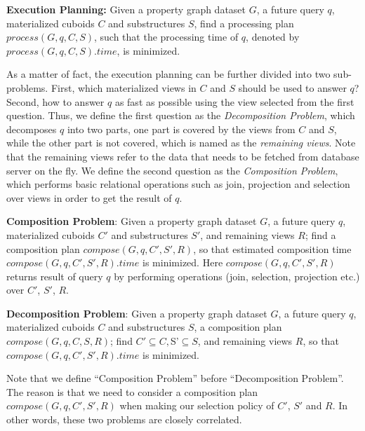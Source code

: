 \noindent\textbf{Execution Planning:} Given a property graph dataset $G$, a future query $q$, materialized cuboids $C$ and substructures $S$, find a processing plan $process(G, q, C, S)$, such that the processing time of $q$, denoted by $process(G, q, C, S).time$, is minimized. 

As a matter of fact, the execution planning can be further divided into two sub-problems. 
First, which materialized views in $C$ and $S$ should be used to answer $q$? Second, how to answer $q$ as fast as possible using the view selected from the first question. Thus, we define the first question as the \emph{Decomposition Problem}, which decomposes $q$ into two parts, one part is covered by the views from $C$ and $S$, while the other part is not covered, which is named as the \emph{remaining views}. Note that the remaining views refer to the data that needs to be fetched from database server on the fly. We  define the second question as the \emph{Composition Problem}, which performs basic relational operations such as join, projection and selection over views in order to get the result of $q$. 

\noindent\textbf{Composition Problem}:
Given a property graph dataset $G$, a future query $q$, materialized cuboids $C'$ and substructures $S'$, and remaining views $R$; find a composition plan $compose(G, q, C', S', R)$, so that estimated composition time $compose(G, q, C', S', R).time$ is minimized. Here $compose(G, q, C', S', R)$ returns result of query $q$ by performing operations (join, selection, projection etc.) over $C'$, $S'$, $R$.


\noindent\textbf{Decomposition Problem}:
Given a property graph dataset $G$, a future query $q$, materialized cuboids $C$ and substructures $S$, a composition plan $compose(G, q, C, S, R)$; find $C' \subseteq C, $S'$\subseteq S$, and remaining views $R$, so that $compose(G, q, C', S', R).time$ is minimized. 

Note that we define ``Composition Problem'' before ``Decomposition Problem''. The reason is that we need to consider a composition plan $compose(G, q, C', S', R)$ when making our selection policy of $C'$, $S'$ and $R$. In other words, these two problems are closely correlated.  

